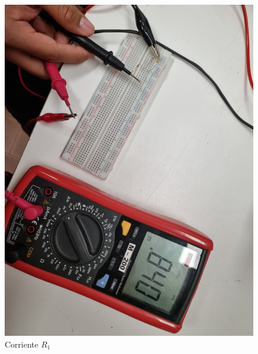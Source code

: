 \documentclass[a4paper,12pt]{article}
\begin{document}
\begin{figure}[H]
    \centering
    \begin{minipage}{0.40\textwidth}
        \centering
        \includegraphics[width=\linewidth]{imagenes/corrientei1.jpg}
        \caption*{Corriente $R_1$}
    \end{minipage}
    \hfill
    \begin{minipage}{0.40\textwidth}
        \centering

\end{minipage}
\end{figure}
\end{document}
